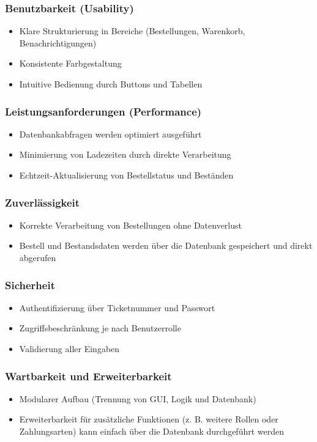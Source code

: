 \subsubsection*{Benutzbarkeit (Usability)}
\begin{itemize}
    \item Klare Strukturierung in Bereiche (Bestellungen, Warenkorb, Benachrichtigungen)
    \item Konsistente Farbgestaltung
    \item Intuitive Bedienung durch Buttons und Tabellen
\end{itemize}

\subsubsection*{Leistungsanforderungen (Performance)}
\begin{itemize}
    \item Datenbankabfragen werden optimiert ausgeführt
    \item Minimierung von Ladezeiten durch direkte Verarbeitung
    \item Echtzeit-Aktualisierung von Bestellstatus und Beständen
\end{itemize}

\subsubsection*{Zuverlässigkeit}
\begin{itemize}
    \item Korrekte Verarbeitung von Bestellungen ohne Datenverlust
    \item Bestell und Bestandsdaten werden über die Datenbank gespeichert und direkt abgerufen
\end{itemize}

\subsubsection*{Sicherheit}
\begin{itemize}
    \item Authentifizierung über Ticketnummer und Passwort
    \item Zugriffsbeschränkung je nach Benutzerrolle
    \item Validierung aller Eingaben
\end{itemize}

\subsubsection*{Wartbarkeit und Erweiterbarkeit}
\begin{itemize}
    \item Modularer Aufbau (Trennung von GUI, Logik und Datenbank)
    \item Erweiterbarkeit für zusätzliche Funktionen (z. B. weitere Rollen oder Zahlungsarten) kann einfach über die Datenbank durchgeführt werden
\end{itemize}